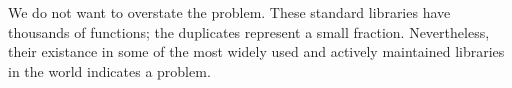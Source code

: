 \documentclass[a4paper,UKenglish,cleveref, autoref]{lipics-v2019}
\begin{document}
We do not want to overstate the problem.
These standard libraries have thousands of functions; the duplicates represent a small fraction.
Nevertheless, their existance in some of the most widely used and actively maintained libraries in the world indicates a problem.

\end{document}
